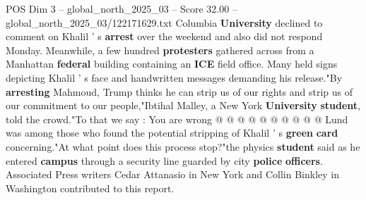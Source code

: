 \begin{textsample}{POS Dim 3 – global\_north\_2025\_03 – Score 32.00 – global\_north\_2025\_03/122171629.txt}
Columbia \textbf{University} declined to comment on Khalil ' s \textbf{arrest} over the weekend and also did not respond Monday.
Meanwhile, a few hundred \textbf{protesters} gathered across from a Manhattan \textbf{federal} building containing an \textbf{ICE} field office.
Many held signs depicting Khalil ' s face and handwritten messages demanding his release."By \textbf{arresting} Mahmoud, Trump thinks he can strip us of our rights and strip us of our commitment to our people,"Ibtihal Malley, a New York \textbf{University} \textbf{student}, told the crowd."To that we say : You are wrong @ @ @ @ @ @ @ @ @ @ Lund was among those who found the potential stripping of Khalil ' s \textbf{green} \textbf{card} concerning."At what point does this process stop?"the physics \textbf{student} said as he entered \textbf{campus} through a security line guarded by city \textbf{police} \textbf{officers}.
Associated Press writers Cedar Attanasio in New York and Collin Binkley in Washington contributed to this report.

\end{textsample}
